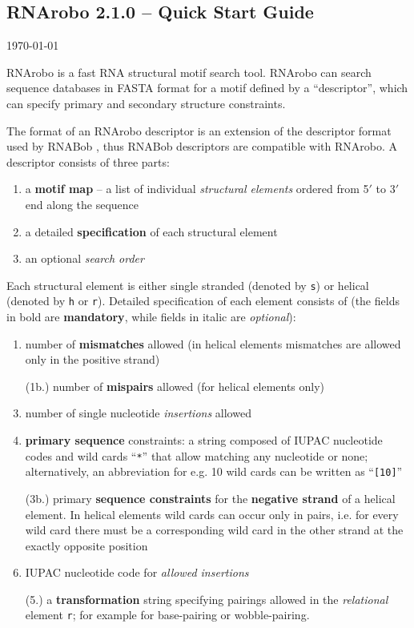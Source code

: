 \documentclass[11pt]{article}
\begin{document}


\begin{center}
\section*{RNArobo 2.1.0 -- Quick Start Guide}
\today
\end{center}

RNArobo is a fast RNA structural motif search tool. RNArobo can search sequence databases in FASTA format for a motif defined by a ``descriptor'', which can specify primary and secondary structure constraints.

The format of an RNArobo descriptor is an extension of the descriptor format used by RNABob \cite{eddy1996}, thus RNABob descriptors are compatible with RNArobo. A descriptor consists of three parts:
\begin{enumerate}
\item a \textbf{motif map} -- a list of individual \emph{structural elements}
  ordered from 5$\mathbb{'}$ to 3$\mathbb{'}$ end along the sequence
\item a detailed \textbf{specification} of each structural element
\item an optional \emph{search order}
\end{enumerate}
Each structural element is either single stranded (denoted by \texttt{s}) or helical (denoted by \texttt{h} or \texttt{r}). Detailed specification of each element consists of (the fields in bold are \textbf{mandatory}, while fields in italic are \emph{optional}):
\begin{enumerate}
\item number of \textbf{mismatches} allowed (in helical elements mismatches are allowed only in the positive strand)
\item[(1b.)] number of \textbf{mispairs} allowed (for helical elements only)
\item number of single nucleotide \emph{insertions} allowed
\item \textbf{primary sequence} constraints: a string composed of IUPAC nucleotide codes and wild cards ``\texttt{*}'' that allow matching any nucleotide or none; alternatively, an abbreviation for e.g. 10 wild cards can be written as ``\texttt{[10]}''
\item[(3b.)] primary \textbf{sequence constraints} for the \textbf{negative strand} of a helical element. In helical elements wild cards can occur only in pairs, i.e. for every wild card there must be a corresponding wild card in the other strand at the exactly opposite position
\item IUPAC nucleotide code for \emph{allowed insertions}
\item[(5.)] a \textbf{transformation} string specifying pairings allowed in the \emph{relational} element \texttt{r}; for example for base-pairing or wobble-pairing.
\end{enumerate}
\end{document}

